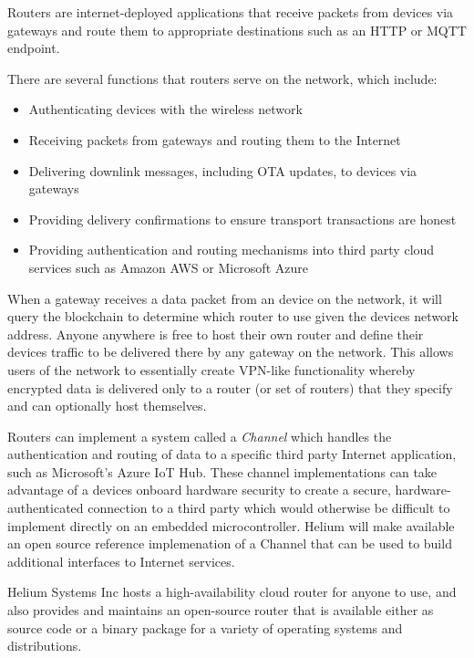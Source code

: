 \documentclass[letterpaper,11pt]{article}
\begin{document}
Routers are internet-deployed applications that receive packets from devices via gateways and route them to appropriate destinations such as an HTTP or MQTT endpoint.\newline

There are several functions that routers serve on the network, which include:

\begin{itemize}
	\item Authenticating devices with the wireless network
	\item Receiving packets from gateways and routing them to the Internet
	\item Delivering downlink messages, including OTA updates, to devices via gateways
	\item Providing delivery confirmations to ensure transport transactions are honest
	\item Providing authentication and routing mechanisms into third party cloud services such as Amazon AWS or Microsoft Azure
\end{itemize}

When a gateway receives a data packet from an device on the network, it will query the blockchain to determine which router to use given the devices network address. Anyone anywhere is free to host their own router and define their devices traffic to be delivered there by any gateway on the network. This allows users of the network to essentially create VPN-like functionality whereby encrypted data is delivered only to a router (or set of routers) that they specify and can optionally host themselves.\newline

Routers can implement a system called a \emph{Channel} which handles the authentication and routing of data to a specific third party Internet application, such as Microsoft's Azure IoT Hub\cite{azure}. These channel implementations can take advantage of a devices onboard hardware security to create a secure, hardware-authenticated connection to a third party which would otherwise be difficult to implement directly on an embedded microcontroller. Helium will make available an open source reference implemenation of a Channel that can be used to build additional interfaces to Internet services.\newline

Helium Systems Inc hosts a high-availability cloud router for anyone to use, and also provides and maintains an open-source router that is available either as source code or a binary package for a variety of operating systems and distributions.\newline
\end{document}
